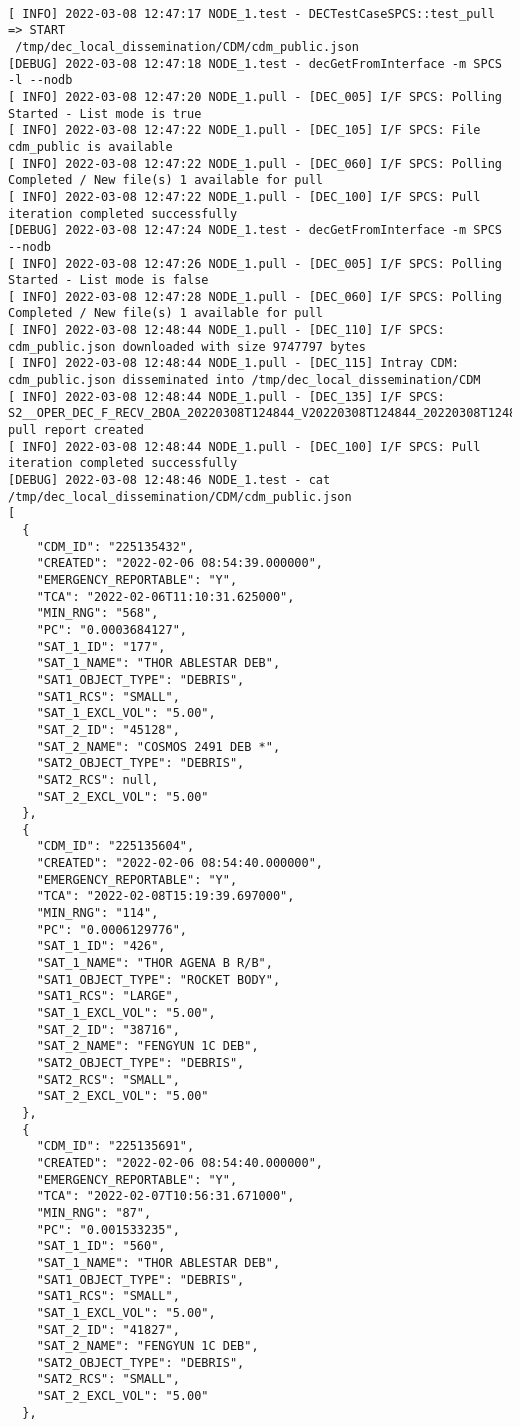 \documentclass[dec_sum_main.tex]{subfiles}
\begin{document}
\begin{Verbatim}[fontsize=\tiny]

[ INFO] 2022-03-08 12:47:17 NODE_1.test - DECTestCaseSPCS::test_pull => START
 /tmp/dec_local_dissemination/CDM/cdm_public.json
[DEBUG] 2022-03-08 12:47:18 NODE_1.test - decGetFromInterface -m SPCS -l --nodb
[ INFO] 2022-03-08 12:47:20 NODE_1.pull - [DEC_005] I/F SPCS: Polling Started - List mode is true
[ INFO] 2022-03-08 12:47:22 NODE_1.pull - [DEC_105] I/F SPCS: File cdm_public is available
[ INFO] 2022-03-08 12:47:22 NODE_1.pull - [DEC_060] I/F SPCS: Polling Completed / New file(s) 1 available for pull
[ INFO] 2022-03-08 12:47:22 NODE_1.pull - [DEC_100] I/F SPCS: Pull iteration completed successfully
[DEBUG] 2022-03-08 12:47:24 NODE_1.test - decGetFromInterface -m SPCS --nodb
[ INFO] 2022-03-08 12:47:26 NODE_1.pull - [DEC_005] I/F SPCS: Polling Started - List mode is false
[ INFO] 2022-03-08 12:47:28 NODE_1.pull - [DEC_060] I/F SPCS: Polling Completed / New file(s) 1 available for pull
[ INFO] 2022-03-08 12:48:44 NODE_1.pull - [DEC_110] I/F SPCS: cdm_public.json downloaded with size 9747797 bytes
[ INFO] 2022-03-08 12:48:44 NODE_1.pull - [DEC_115] Intray CDM: cdm_public.json disseminated into /tmp/dec_local_dissemination/CDM
[ INFO] 2022-03-08 12:48:44 NODE_1.pull - [DEC_135] I/F SPCS: S2__OPER_DEC_F_RECV_2BOA_20220308T124844_V20220308T124844_20220308T124844_SPCS.xml pull report created
[ INFO] 2022-03-08 12:48:44 NODE_1.pull - [DEC_100] I/F SPCS: Pull iteration completed successfully
[DEBUG] 2022-03-08 12:48:46 NODE_1.test - cat /tmp/dec_local_dissemination/CDM/cdm_public.json
[
  {
    "CDM_ID": "225135432",
    "CREATED": "2022-02-06 08:54:39.000000",
    "EMERGENCY_REPORTABLE": "Y",
    "TCA": "2022-02-06T11:10:31.625000",
    "MIN_RNG": "568",
    "PC": "0.0003684127",
    "SAT_1_ID": "177",
    "SAT_1_NAME": "THOR ABLESTAR DEB",
    "SAT1_OBJECT_TYPE": "DEBRIS",
    "SAT1_RCS": "SMALL",
    "SAT_1_EXCL_VOL": "5.00",
    "SAT_2_ID": "45128",
    "SAT_2_NAME": "COSMOS 2491 DEB *",
    "SAT2_OBJECT_TYPE": "DEBRIS",
    "SAT2_RCS": null,
    "SAT_2_EXCL_VOL": "5.00"
  },
  {
    "CDM_ID": "225135604",
    "CREATED": "2022-02-06 08:54:40.000000",
    "EMERGENCY_REPORTABLE": "Y",
    "TCA": "2022-02-08T15:19:39.697000",
    "MIN_RNG": "114",
    "PC": "0.0006129776",
    "SAT_1_ID": "426",
    "SAT_1_NAME": "THOR AGENA B R/B",
    "SAT1_OBJECT_TYPE": "ROCKET BODY",
    "SAT1_RCS": "LARGE",
    "SAT_1_EXCL_VOL": "5.00",
    "SAT_2_ID": "38716",
    "SAT_2_NAME": "FENGYUN 1C DEB",
    "SAT2_OBJECT_TYPE": "DEBRIS",
    "SAT2_RCS": "SMALL",
    "SAT_2_EXCL_VOL": "5.00"
  },
  {
    "CDM_ID": "225135691",
    "CREATED": "2022-02-06 08:54:40.000000",
    "EMERGENCY_REPORTABLE": "Y",
    "TCA": "2022-02-07T10:56:31.671000",
    "MIN_RNG": "87",
    "PC": "0.001533235",
    "SAT_1_ID": "560",
    "SAT_1_NAME": "THOR ABLESTAR DEB",
    "SAT1_OBJECT_TYPE": "DEBRIS",
    "SAT1_RCS": "SMALL",
    "SAT_1_EXCL_VOL": "5.00",
    "SAT_2_ID": "41827",
    "SAT_2_NAME": "FENGYUN 1C DEB",
    "SAT2_OBJECT_TYPE": "DEBRIS",
    "SAT2_RCS": "SMALL",
    "SAT_2_EXCL_VOL": "5.00"
  },


\end{Verbatim}
\end{document}
